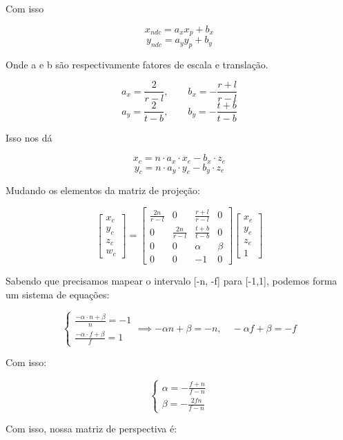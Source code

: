 \documentclass[12pt]{article}
\begin{document}
\noindent
Com isso

\[
    x_{ndc} = a_x x_p + b_x
\]
\[    
    y_{ndc} = a_y y_p + b_y
\]

\noindent
Onde a e b são respectivamente fatores de escala e translação.

\[
    a_x = \frac{2}{r-l}, \qquad b_x = -\frac{r+l}{r-l}
\]
\[
    a_y = \frac{2}{t-b}, \qquad b_y = -\frac{t+b}{t-b}
\]

\noindent
Isso nos dá

\[
    x_c = n \cdot a_x \cdot x_e - b_x \cdot z_e
\]
\[
    y_c = n \cdot a_y \cdot y_e - b_y \cdot z_e
\]

Mudando os elementos da matriz de projeção:

\[
\begin{bmatrix}
    x_c \\
    y_c \\
    z_c \\
    w_c
\end{bmatrix}
=
\begin{bmatrix}
    \frac{2n}{r-l} & 0 & \frac{r+l}{r-l} & 0 \\
    0 & \frac{2n}{r-l} & \frac{t+b}{t-b} & 0 \\
    0 & 0 & \alpha & \beta \\
    0 & 0 & -1 & 0
\end{bmatrix}
\begin{bmatrix}
    x_e \\
    y_e \\
    z_e \\
    1
\end{bmatrix}    
\]

Sabendo que precisamos mapear o intervalo [-n, -f] para [-1,1], podemos forma um sistema de equações:

\[
\begin{cases}
    \frac{-\alpha \cdot n + \beta}{n} = -1 \\
    \frac{-\alpha \cdot f + \beta}{f} = 1
\end{cases}
\implies
-\alpha n + \beta = -n, \quad  -\alpha f + \beta = -f
\]

\noindent
Com isso:

\[
\begin{cases}
    \alpha = -\frac{f+n}{f-n} \\
    \beta = -\frac{2fn}{f-n}
\end{cases}    
\]

\noindent
Com isso, nossa matriz de perspectiva é:
\end{document}
